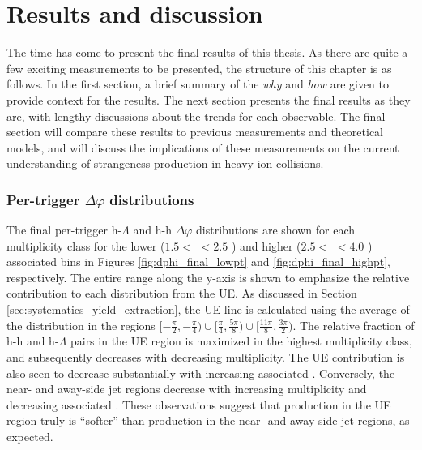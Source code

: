 \chapter{Results and discussion}
\label{chapter_results}

The time has come to present the final results of this thesis. As there are quite a few exciting measurements to be presented, the structure of this chapter is as follows. In the first section, a brief summary of the \textit{why} and \textit{how} are given to provide context for the results. The next section presents the final results as they are, with lengthy discussions about the trends for each observable. The final section will compare these results to previous measurements and theoretical models, and will discuss the implications of these measurements on the current understanding of strangeness production in heavy-ion collisions.

















\subsection{Per-trigger $\Delta\varphi$ distributions}

The final per-trigger h-$\Lambda$ and h-h $\Delta\varphi$ distributions are shown for each multiplicity class for the lower ($1.5 <$ \pt $< 2.5$ \GeVc) and higher ($2.5 < $ \pt $< 4.0$ \GeVc) associated \pt bins in Figures \ref{fig:dphi_final_lowpt} and \ref{fig:dphi_final_highpt}, respectively. The entire range along the y-axis is shown to emphasize the relative contribution to each distribution from the UE. As discussed in Section \ref{sec:systematics_yield_extraction}, the UE line is calculated using the average of the distribution in the regions $[-\frac{\pi}{2}, -\frac{\pi}{4}) \cup [\frac{\pi}{4}, \frac{5\pi}{8}) \cup [\frac{11\pi}{8}, \frac{3\pi}{2})$. The relative fraction of h-h and h-$\Lambda$ pairs in the UE region is maximized in the highest multiplicity class, and subsequently decreases with decreasing multiplicity. The UE contribution is also seen to decrease substantially with increasing associated \pt. Conversely, the near- and away-side jet regions decrease with increasing multiplicity and decreasing associated \pt. These observations suggest that production in the UE region truly is ``softer'' than production in the near- and away-side jet regions, as expected.

